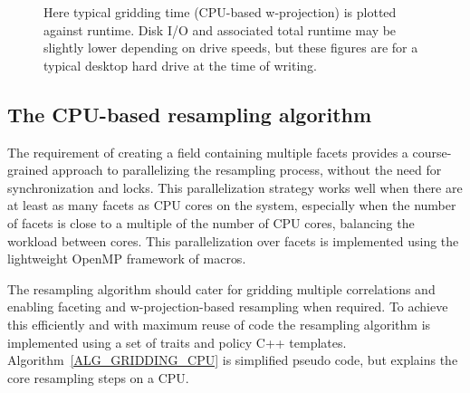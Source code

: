\begin{figure}[ht!]
 \begin{mdframed}
 \centering
  \caption{Here typical gridding time (CPU-based w-projection) is plotted against runtime. 
	   Disk I/O and associated total runtime may be slightly lower depending on 
	   drive speeds, but these figures are for a typical desktop hard drive at the time
	   of writing.}
  \label{FIG_GRIDDING_VS_RUNTIME}
  \end{mdframed}
\end{figure}

\subsection{The CPU-based resampling algorithm}
The requirement of creating a field containing multiple facets provides a course-grained approach to parallelizing the resampling process,
without the need for synchronization and locks. This parallelization strategy works well when there are at least as many facets as CPU cores 
on the system, especially when the number of facets is close to a multiple of the number of CPU cores, balancing the workload between cores. This
parallelization over facets is implemented using the lightweight OpenMP framework of macros.

The resampling algorithm should cater for gridding multiple correlations and enabling faceting and w-projection-based resampling when required.
To achieve this efficiently and with maximum reuse of code the resampling algorithm is implemented using a set of traits and policy C++ templates.
Algorithm~\ref{ALG_GRIDDING_CPU} is simplified pseudo code, but explains the core resampling steps on a CPU.

